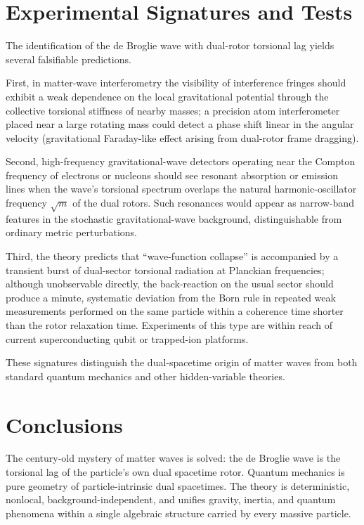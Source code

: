 \documentclass[dvipdfmx,a4paper]{article}
\begin{document}
\section{Experimental Signatures and Tests}

The identification of the de Broglie wave with dual-rotor torsional lag yields several falsifiable predictions.

First, in matter-wave interferometry the visibility of interference fringes should exhibit a weak dependence on the local gravitational potential through the collective torsional stiffness of nearby masses; a precision atom interferometer placed near a large rotating mass could detect a phase shift linear in the angular velocity (gravitational Faraday-like effect arising from dual-rotor frame dragging).

Second, high-frequency gravitational-wave detectors operating near the Compton frequency of electrons or nucleons should see resonant absorption or emission lines when the wave’s torsional spectrum overlaps the natural harmonic-oscillator frequency \(\sqrt{m}\) of the dual rotors. Such resonances would appear as narrow-band features in the stochastic gravitational-wave background, distinguishable from ordinary metric perturbations.

Third, the theory predicts that “wave-function collapse” is accompanied by a transient burst of dual-sector torsional radiation at Planckian frequencies; although unobservable directly, the back-reaction on the usual sector should produce a minute, systematic deviation from the Born rule in repeated weak measurements performed on the same particle within a coherence time shorter than the rotor relaxation time. Experiments of this type are within reach of current superconducting qubit or trapped-ion platforms.

These signatures distinguish the dual-spacetime origin of matter waves from both standard quantum mechanics and other hidden-variable theories.

\section{Conclusions}

The century-old mystery of matter waves is solved: the de Broglie wave is the torsional lag of the particle’s own dual spacetime rotor. Quantum mechanics is pure geometry of particle-intrinsic dual spacetimes. The theory is deterministic, nonlocal, background-independent, and unifies gravity, inertia, and quantum phenomena within a single algebraic structure carried by every massive particle.
\end{document}
